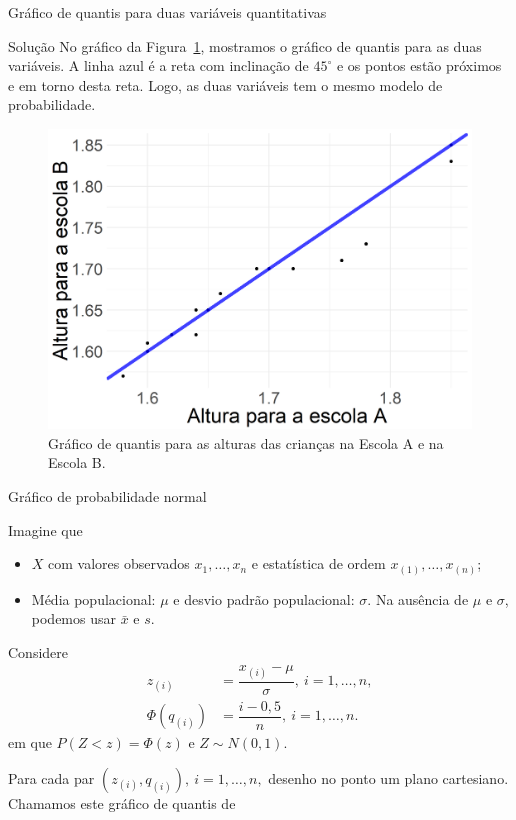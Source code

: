 \documentclass[10pt]{beamer}
\begin{document}
\begin{frame}{Gráfico de quantis para duas variáveis quantitativas}

\begin{block}{Solução}
	No gráfico da Figura~\ref{fig:escolas}, mostramos o gráfico de quantis para as duas variáveis. A linha azul é a reta com inclinação de $45^\circ$ e os pontos estão próximos e em torno desta reta. Logo, as duas variáveis tem o mesmo modelo de probabilidade.
	
	\begin{figure}[htbp]
		\centering
		\caption{Gráfico de quantis para as alturas das crianças na Escola A e na Escola B.}
		\label{fig:escolas}		\includegraphics[width=0.4\linewidth]{figures/qqplot.png}
	\end{figure}
\end{block}

\end{frame}

\begin{frame}{Gráfico de probabilidade normal}

Imagine que
\begin{itemize}
	\item $X$ com valores observados $x_1, \dots, x_n$ e estatística de ordem $x_{(1)}, \dots, x_{(n)}$;
	\item Média populacional: $\mu$ e desvio padrão populacional: $\sigma$. Na ausência de $\mu$ e $\sigma$, podemos usar $\bar{x}$ e $s$.
\end{itemize}
\vfill

Considere 
\begin{align*}
z_{(i)} &= \dfrac{x_{(i)}-\mu}{\sigma},\ i=1, \dots, n,\\
\Phi \left( q_{(i)} \right) &=  \dfrac{i - 0,5}{n} ,\ i = 1, \dots, n.
\end{align*}
em que $P(Z < z) = \Phi(z)$ e $Z \sim N(0,1)$.
\vfill

Para cada par $(z_{(i)}, q_{(i)}),\ i=1, \dots, n,$ desenho no ponto um plano cartesiano. Chamamos este gráfico de quantis de \color{red}{gráfico de probabilidade normal.}
\end{frame}
\end{document}
